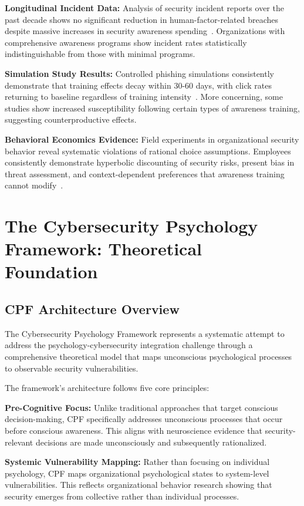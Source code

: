 \documentclass[11pt,a4paper]{article}
\begin{document}
\textbf{Longitudinal Incident Data:} Analysis of security incident reports over the past decade shows no significant reduction in human-factor-related breaches despite massive increases in security awareness spending~\cite{ponemon2023}. Organizations with comprehensive awareness programs show incident rates statistically indistinguishable from those with minimal programs.

\textbf{Simulation Study Results:} Controlled phishing simulations consistently demonstrate that training effects decay within 30-60 days, with click rates returning to baseline regardless of training intensity~\cite{caputo2014}. More concerning, some studies show increased susceptibility following certain types of awareness training, suggesting counterproductive effects.

\textbf{Behavioral Economics Evidence:} Field experiments in organizational security behavior reveal systematic violations of rational choice assumptions. Employees consistently demonstrate hyperbolic discounting of security risks, present bias in threat assessment, and context-dependent preferences that awareness training cannot modify~\cite{anderson2019}.

\section{The Cybersecurity Psychology Framework: Theoretical Foundation}

\subsection{CPF Architecture Overview}

The Cybersecurity Psychology Framework represents a systematic attempt to address the psychology-cybersecurity integration challenge through a comprehensive theoretical model that maps unconscious psychological processes to observable security vulnerabilities.

The framework's architecture follows five core principles:

\textbf{Pre-Cognitive Focus:} Unlike traditional approaches that target conscious decision-making, CPF specifically addresses unconscious processes that occur before conscious awareness. This aligns with neuroscience evidence that security-relevant decisions are made unconsciously and subsequently rationalized.

\textbf{Systemic Vulnerability Mapping:} Rather than focusing on individual psychology, CPF maps organizational psychological states to system-level vulnerabilities. This reflects organizational behavior research showing that security emerges from collective rather than individual processes.
\end{document}
